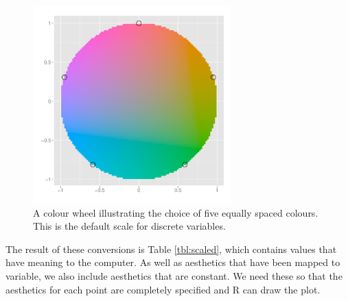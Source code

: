 \begin{figure}[htbp]
  \centering
    \includegraphics[width=3in]{diagrams/colour-wheel}
  \caption{A colour wheel illustrating the choice of five equally spaced colours. This is the default scale for discrete variables.}
  \label{fig:colour-wheel}
\end{figure}

The result of these conversions is Table \ref{tbl:scaled}, which
contains values that have meaning to the computer. As well as aesthetics
that have been mapped to variable, we also include aesthetics that are
constant. We need these so that the aesthetics for each point are
completely specified and R can draw the plot.


